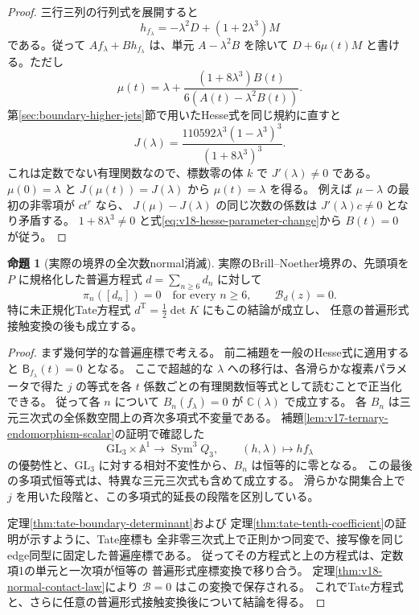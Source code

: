 \documentclass[a4paper,11pt]{ltjsarticle}
\theoremstyle{definition}
\newtheorem{theorem}{命題}[section]
\begin{document}
\begin{proof}
三行三列の行列式を展開すると
\[
 h_{f_\lambda}=-\lambda^2D+(1+2\lambda^3)M
\]
である。従って $A f_\lambda+B h_{f_\lambda}$ は、単元 $A-\lambda^2B$ を除いて
$D+6\mu(t)M$ と書ける。ただし
\begin{equation}\label{eq:v18-hesse-parameter-change}
 \mu(t)=\lambda+
 \frac{(1+8\lambda^3)B(t)}{6(A(t)-\lambda^2B(t))}.
\end{equation}
第\ref{sec:boundary-higher-jets}節で用いたHesse式を同じ規約に直すと
\begin{equation}\label{eq:v18-hesse-j-function}
 J(\lambda)=
 \frac{110592\lambda^3(1-\lambda^3)^3}{(1+8\lambda^3)^3}.
\end{equation}
これは定数でない有理関数なので、標数零の体 $k$ で $J'(\lambda)\ne0$ である。
$\mu(0)=\lambda$ と $J(\mu(t))=J(\lambda)$ から $\mu(t)=\lambda$ を得る。
例えば $\mu-\lambda$ の最初の非零項が $c t^r$ なら、
$J(\mu)-J(\lambda)$ の同じ次数の係数は $J'(\lambda)c\ne0$ となり矛盾する。
$1+8\lambda^3\ne0$ と式\eqref{eq:v18-hesse-parameter-change}から $B(t)=0$ が従う。
\end{proof}

\begin{theorem}[実際の境界の全次数normal消滅]
\label{thm:v18-all-order-normal-vanishing}
実際のBrill--Noether境界の、先頭項を $P$ に規格化した普遍方程式
$d=\sum_{n\ge6}d_n$ に対して
\begin{equation}\label{eq:v18-all-order-normal-vanishing}
 \boxed{\displaystyle
  \pi_n([d_n])=0\quad\text{for every }n\ge6,\qquad
  \mathcal B_d(z)=0.}
\end{equation}
特に未正規化Tate方程式 $d^{\mathrm T}=\frac12\det K$ にもこの結論が成立し、
任意の普遍形式接触変換の後も成立する。
\end{theorem}

\begin{proof}
まず幾何学的な普遍座標で考える。
前二補題を一般のHesse式に適用すると
$\mathsf B_{f_\lambda}(t)=0$ となる。
ここで超越的な $\lambda$ への移行は、各滑らかな複素パラメータで得た
$j$ の等式を各 $t$ 係数ごとの有理関数恒等式として読むことで正当化できる。
従って各 $n$ について $B_n(f_\lambda)=0$ が $\mathbb C(\lambda)$ で成立する。
各 $B_n$ は三元三次式の全係数空間上の斉次多項式不変量である。
補題\ref{lem:v17-ternary-endomorphism-scalar}の証明で確認した
\[
 \mathrm{GL}_3\times\mathbb A^1\longrightarrow\operatorname{Sym}^3Q_3,
 \qquad(h,\lambda)\longmapsto h f_\lambda
\]
の優勢性と、$\mathrm{GL}_3$ に対する相対不変性から、$B_n$ は恒等的に零となる。
この最後の多項式恒等式は、特異な三元三次式も含めて成立する。
滑らかな開集合上で $j$ を用いた段階と、この多項式的延長の段階を区別している。

定理\ref{thm:tate-boundary-determinant}および
定理\ref{thm:tate-tenth-coefficient}の証明が示すように、Tate座標も
全非零三次式上で正則かつ同変で、接写像を同じedge同型に固定した普遍座標である。
従ってその方程式と上の方程式は、定数項1の単元と一次項が恒等の
普遍形式座標変換で移り合う。
定理\ref{thm:v18-normal-contact-law}により $\mathcal B=0$ はこの変換で保存される。
これでTate方程式と、さらに任意の普遍形式接触変換後について結論を得る。
\end{proof}
\end{document}
